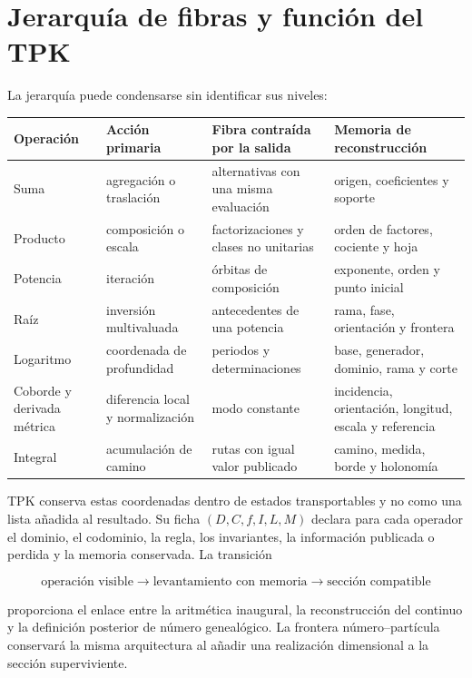 \section{Jerarquía de fibras y función del TPK}

La jerarquía puede condensarse sin identificar sus niveles:

\begin{center}
\small
\begin{tabularx}{\textwidth}{@{}
  >{\raggedright\arraybackslash}p{}
  >{\raggedright\arraybackslash}p{}
  >{\raggedright\arraybackslash}X
  >{\raggedright\arraybackslash}p{}@{}}
\toprule
\textbf{Operación} & \textbf{Acción primaria} &
\textbf{Fibra contraída por la salida} & \textbf{Memoria de reconstrucción}\\
\midrule
Suma & agregación o traslación & alternativas con una misma evaluación &
origen, coeficientes y soporte\\
Producto & composición o escala & factorizaciones y clases no unitarias &
orden de factores, cociente y hoja\\
Potencia & iteración & órbitas de composición &
exponente, orden y punto inicial\\
Raíz & inversión multivaluada & antecedentes de una potencia &
rama, fase, orientación y frontera\\
Logaritmo & coordenada de profundidad & periodos y determinaciones &
base, generador, dominio, rama y corte\\
Coborde y derivada métrica & diferencia local y normalización & modo constante &
incidencia, orientación, longitud, escala y referencia\\
Integral & acumulación de camino & rutas con igual valor publicado &
camino, medida, borde y holonomía\\
\bottomrule
\end{tabularx}
\end{center}

TPK conserva estas coordenadas dentro de estados transportables y no como una
lista añadida al resultado. Su ficha \((D,C,f,I,L,M)\) declara para cada
operador el dominio, el codominio, la regla, los invariantes, la información
publicada o perdida y la memoria conservada. La transición

\[
 \text{operación visible}
 \longrightarrow
 \text{levantamiento con memoria}
 \longrightarrow
 \text{sección compatible}
\]

proporciona el enlace entre la aritmética inaugural, la reconstrucción del
continuo y la definición posterior de número genealógico. La frontera
número--partícula conservará la misma arquitectura al añadir una realización
dimensional a la sección superviviente.

